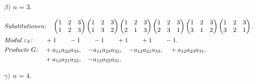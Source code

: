 \documentclass[11pt]{article}
\begin{document}
$\beta)$ \quad $n = 3.$

\[
\begin{aligned}
&\textit{Substitutionen:}\quad \begin{pmatrix}1&2&3\\1&2&3\end{pmatrix} \begin{pmatrix}1&2&3\\1&3&2\end{pmatrix} \begin{pmatrix}1&2&3\\2&1&3\end{pmatrix} \begin{pmatrix}1&2&3\\2&3&1\end{pmatrix} \begin{pmatrix}1&2&3\\3&1&2\end{pmatrix} \begin{pmatrix}1&2&3\\3&2&1\end{pmatrix}.\\
&\textit{Modul } \varepsilon_S\textit{:}\qquad {}+1 \qquad -1 \qquad -1 \qquad {}+1 \qquad {}+1 \qquad -1.\\
&\textit{Producte } G\textit{:}\quad {}+a_{11}a_{22}a_{33}, \quad -a_{11}a_{23}a_{32}, \quad -a_{12}a_{21}a_{33}, \quad {}+a_{12}a_{23}a_{31},\\
&\hphantom{\textit{Producte } G\textit{:}}\quad {}+a_{13}a_{21}a_{32}, \quad -a_{13}a_{22}a_{31}.
\end{aligned}
\]

$\gamma)$ \quad $n = 4.$
\end{document}
